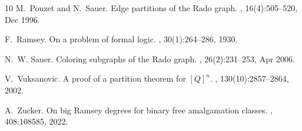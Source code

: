 \begin{thebibliography}{10}
M.~Pouzet and N.~Sauer.
\newblock Edge partitions of the {R}ado graph.
, 16(4):505--520, Dec 1996.

F.~Ramsey.
\newblock On a problem of formal logic.
, 30(1):264--286, 1930.

N.~W. Sauer.
\newblock Coloring subgraphs of the {R}ado graph.
, 26(2):231--253, Apr 2006.

V.~Vuksanovic.
\newblock A proof of a partition theorem for $[{Q}]^n$.
,
  130(10):2857--2864, 2002.

A.~Zucker.
\newblock On big {R}amsey degrees for binary free amalgamation classes.
, 408:108585, 2022.

\end{thebibliography}
